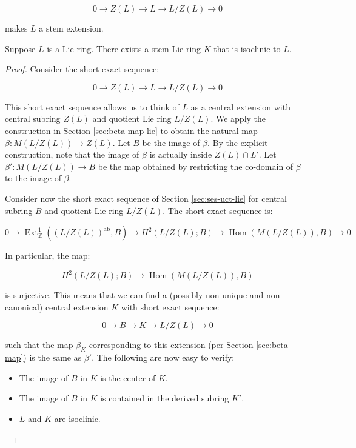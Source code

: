 $$0 \to Z(L) \to L \to L/Z(L) \to 0$$

makes $L$ a stem extension.

\begin{theorem}\label{thm:stem-lie-ring-existence}
  Suppose $L$ is a Lie ring. There exists a stem Lie ring $K$ that is
  isoclinic to $L$.
\end{theorem}

\begin{proof}
  Consider the short exact sequence:

  $$0 \to Z(L) \to L \to L/Z(L) \to 0$$

  This short exact sequence allows us to think of $L$ as a central
  extension with central subring $Z(L)$ and quotient Lie ring
  $L/Z(L)$. We apply the construction in Section \ref{sec:beta-map-lie} to
  obtain the natural map $\beta:M(L/Z(L)) \to Z(L)$. Let $B$ be the
  image of $\beta$. By the explicit construction, note that the image of
  $\beta$ is actually inside $Z(L) \cap L'$. Let $\beta':M(L/Z(L)) \to
  B$ be the map obtained by restricting the co-domain of $\beta$ to
  the image of $\beta$.

  Consider now the short exact sequence of Section \ref{sec:ses-uct-lie}
  for central subring $B$ and quotient Lie ring $L/Z(L)$. The short exact sequence is:

  $$0 \to \operatorname{Ext}^1_{\mathbb{Z}}((L/Z(L))^{\operatorname{ab}},B) \to H^2(L/Z(L);B) \to \operatorname{Hom}(M(L/Z(L)),B) \to 0$$

  In particular, the map:

  $$H^2(L/Z(L);B) \to \operatorname{Hom}(M(L/Z(L)),B)$$

  is surjective. This means that we can find a (possibly non-unique
  and non-canonical) central extension $K$ with short exact sequence:

  $$0 \to B \to K \to L/Z(L) \to 0$$

  such that the map $\beta_K$ corresponding to this extension (per
  Section \ref{sec:beta-map}) is the same as $\beta'$. The following
  are now easy to verify: %

  \begin{itemize}
  \item The image of $B$ in $K$ is the center of $K$.
  \item The image of $B$ in $K$ is contained in the derived subring $K'$.
  \item $L$ and $K$ are isoclinic.
  \end{itemize}
\end{proof}
  
